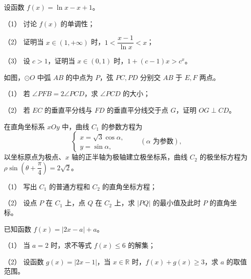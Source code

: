 \begin{question}
设函数 \(f(x)=\ln x-x+1\)。

（1） 讨论 \(f(x)\) 的单调性；

（2） 证明当 \(x\in(1,+\infty)\) 时，\(1<\dfrac{x-1}{\ln x}<x\)；

（3） 设 \(c>1\)，证明当 \(x\in(0,1)\) 时，\(1+(c-1)x>c^x\)。

\Needspace{0.4\textheight}
\end{question}
\begin{question}
如图，\(\odot O\) 中弧 \(AB\) 的中点为 \(P\)，弦 \(PC,PD\) 分别交 \(AB\) 于 \(E,F\) 两点。
\nopagebreak[4]
\begin{center}\end{center}
\nopagebreak[4]
（1） 若 \(\angle PFB=2\angle PCD\)，求 \(\angle PCD\) 的大小；

（2） 若 \(EC\) 的垂直平分线与 \(FD\) 的垂直平分线交于点 \(G\)，证明 \(OG\perp CD\)。

\end{question}
\begin{question}
在直角坐标系 \(xOy\) 中，曲线 \(C_1\) 的参数方程为
\nopagebreak[4]
\[
\begin{cases}
x=\sqrt3\cos\alpha,\\
y=\sin\alpha,
\end{cases}
\qquad(\alpha\text{ 为参数}),
\]
以坐标原点为极点、\(x\) 轴的正半轴为极轴建立极坐标系，曲线 \(C_2\) 的极坐标方程为 \(\rho\sin\left(\theta+\dfrac\pi4\right)=2\sqrt2\)。

（1） 写出 \(C_1\) 的普通方程和 \(C_2\) 的直角坐标方程；

（2） 设点 \(P\) 在 \(C_1\) 上，点 \(Q\) 在 \(C_2\) 上，求 \(|PQ|\) 的最小值及此时 \(P\) 的直角坐标。

\end{question}
\begin{question}
已知函数 \(f(x)=|2x-a|+a\)。

（1） 当 \(a=2\) 时，求不等式 \(f(x)\leq6\) 的解集；

（2） 设函数 \(g(x)=|2x-1|\)，当 \(x\in\mathbb R\) 时，\(f(x)+g(x)\geq3\)，求 \(a\) 的取值范围。

\end{question}